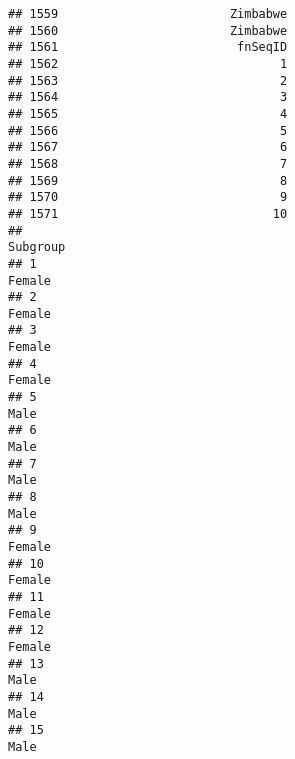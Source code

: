 \documentclass[]{article}
\begin{document}
\begin{verbatim}
## 1559                        Zimbabwe
## 1560                        Zimbabwe
## 1561                         fnSeqID
## 1562                               1
## 1563                               2
## 1564                               3
## 1565                               4
## 1566                               5
## 1567                               6
## 1568                               7
## 1569                               8
## 1570                               9
## 1571                              10
##                                                                                                                             Subgroup
## 1                                                                                                                             Female
## 2                                                                                                                             Female
## 3                                                                                                                             Female
## 4                                                                                                                             Female
## 5                                                                                                                               Male
## 6                                                                                                                               Male
## 7                                                                                                                               Male
## 8                                                                                                                               Male
## 9                                                                                                                             Female
## 10                                                                                                                            Female
## 11                                                                                                                            Female
## 12                                                                                                                            Female
## 13                                                                                                                              Male
## 14                                                                                                                              Male
## 15                                                                                                                              Male

\end{verbatim}
\end{document}
